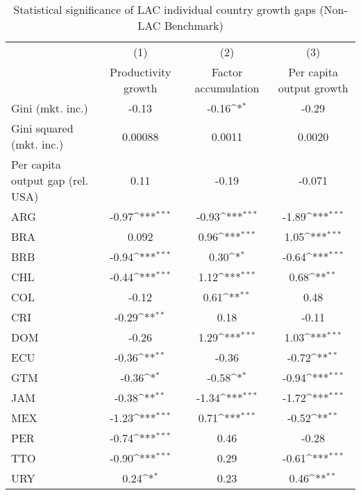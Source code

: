 \begin{sidewaystable}[htbp]\centering
\def\sym#1{\ifmmode^{#1}\else\(^{#1}\)\fi}
\caption{Statistical significance of LAC individual country growth gaps (Non-LAC Benchmark)}
\begin{tabular}{l*{3}{c}}
\toprule
                &\multicolumn{1}{c}{(1)}&\multicolumn{1}{c}{(2)}&\multicolumn{1}{c}{(3)}\\
                &\multicolumn{1}{c}{Productivity growth}&\multicolumn{1}{c}{Factor accumulation}&\multicolumn{1}{c}{Per capita output growth}\\
\midrule
Gini (mkt. inc.)&    -0.13         &    -0.16\sym{*}  &    -0.29         \\
Gini squared (mkt. inc.)&  0.00088         &   0.0011         &   0.0020         \\
Per capita output gap (rel. USA)&     0.11         &    -0.19         &   -0.071         \\
ARG             &    -0.97\sym{***}&    -0.93\sym{***}&    -1.89\sym{***}\\
BRA             &    0.092         &     0.96\sym{***}&     1.05\sym{***}\\
BRB             &    -0.94\sym{***}&     0.30\sym{*}  &    -0.64\sym{***}\\
CHL             &    -0.44\sym{***}&     1.12\sym{***}&     0.68\sym{**} \\
COL             &    -0.12         &     0.61\sym{**} &     0.48         \\
CRI             &    -0.29\sym{**} &     0.18         &    -0.11         \\
DOM             &    -0.26         &     1.29\sym{***}&     1.03\sym{***}\\
ECU             &    -0.36\sym{**} &    -0.36         &    -0.72\sym{**} \\
GTM             &    -0.36\sym{*}  &    -0.58\sym{*}  &    -0.94\sym{***}\\
JAM             &    -0.38\sym{**} &    -1.34\sym{***}&    -1.72\sym{***}\\
MEX             &    -1.23\sym{***}&     0.71\sym{***}&    -0.52\sym{**} \\
PER             &    -0.74\sym{***}&     0.46         &    -0.28         \\
TTO             &    -0.90\sym{***}&     0.29         &    -0.61\sym{***}\\
URY             &     0.24\sym{*}  &     0.23         &     0.46\sym{**} \\

\end{tabular}
\end{sidewaystable}
